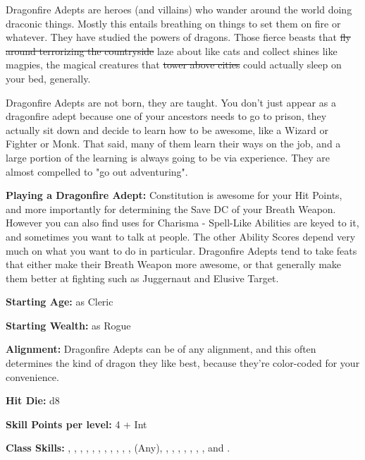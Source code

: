 
Dragonfire Adepts are heroes (and villains) who wander around the world doing draconic things. Mostly this entails breathing on things to set them on fire or whatever. They have studied the powers of dragons. Those fierce beasts that \sout{fly around terrorizing the countryside} laze about like cats and collect shines like magpies, the magical creatures that \sout{tower above cities} could actually sleep on your bed, generally.

Dragonfire Adepts are not born, they are taught. You don't just appear as a dragonfire adept because one of your ancestors needs to go to prison, they actually sit down and decide to learn how to be awesome, like a Wizard or Fighter or Monk. That said, many of them learn their ways on the job, and a large portion of the learning is always going to be via experience. They are almost compelled to "go out adventuring".

\textbf{Playing a Dragonfire Adept:} Constitution is awesome for your Hit Points, and more importantly for determining the Save DC of your Breath Weapon. However you can also find uses for Charisma - Spell-Like Abilities are keyed to it, and sometimes you want to talk at people. The other Ability Scores depend very much on what you want to do in particular. Dragonfire Adepts tend to take feats that either make their Breath Weapon more awesome, or that generally make them better at fighting such as Juggernaut and Elusive Target.

\textbf{Starting Age:} as Cleric

\textbf{Starting Wealth:} as Rogue

\textbf{Alignment:} Dragonfire Adepts can be of any alignment, and this often determines the kind of dragon they like best, because they're color-coded for your convenience.

\textbf{Hit Die:} d8

\textbf{Skill Points per level:} 4 + Int

\textbf{Class Skills:} , , , , , , , , , , ,  (Any), , , , , , , , and .

